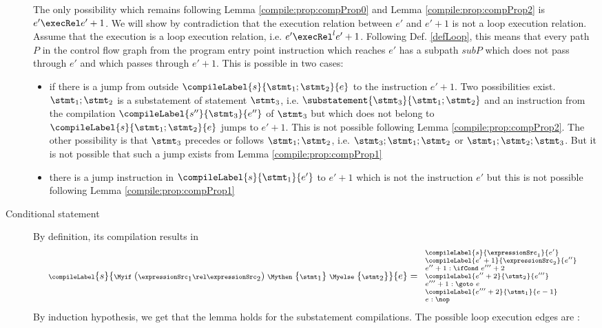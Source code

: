 \begin{description}
The only possibility which remains following
  Lemma \ref{compile:prop:compProp0} and Lemma \ref{compile:prop:compProp2}  is
$e' \execRel e'+1$. We will show  by contradiction that the execution relation between $e'$ and $e'+1$ is not a loop execution relation.
Assume that the execution is a loop execution relation, i.e. $e' \execRel^{l} e'+1$. Following Def. \ref{defLoop}, this means that every path $P$ in the control flow graph 
 from the program entry point instruction which reaches $e'$ has a subpath $ subP $ which does not pass through $e'$ and which passes through $e'+1$.
 This is possible in two cases:
\begin{itemize}
\item  if there is a jump from outside $\compileLabel{s}{\stmt_1;\stmt_2}{e}$ to the instruction $e'+1$.
       Two possibilities exist.  $\stmt_1;\stmt_2$ is a substatement of  statement $\stmt_3$, i.e. $\substatement{\stmt_3}{\stmt_1;\stmt_2 }$ 
       and an instruction from the compilation  $\compileLabel{s''}{\stmt_3}{e''}$ of $\stmt_3$ but which does not belong to  $\compileLabel{s}{\stmt_1;\stmt_2}{e}$ 
       jumps to $e'+1$.  This is not possible following Lemma \ref{compile:prop:compProp2}. The other possibility is that $\stmt_3$ precedes or follows
       $\stmt_1;\stmt_2$, i.e. $\stmt_3;\stmt_1;\stmt_2$ or $\stmt_1;\stmt_2;\stmt_3$. But it is not possible that such  a jump exists from Lemma  \ref{compile:prop:compProp1}

\item there is a jump instruction in $\compileLabel{s}{\stmt_1}{e'}$ to  $e'+1$ which is not the instruction $e'$
      but this is not possible following Lemma \ref{compile:prop:compProp1}
\end{itemize}


\item[Conditional statement]
By definition, its compilation results in
  $$ \scriptsize{\compileLabel{s}{ \Myif \ ( \expressionSrc_1 \rel \expressionSrc_2 ) \ \Mythen \ \{ \stmt_1 \} \  \Myelse \ \{ \stmt_2 \}   }{e} = 
\begin{array}{l}
  \compileLabel{s}{\expressionSrc_1}{e'}\\
  \compileLabel{e'+1}{\expressionSrc_2}{e''}\\  
  e'' + 1: \ifCond \ e''' + 2 \\
  \compileLabel{e'' + 2}{\stmt_2}{e'''}\\ 
  e''' + 1: \goto \ e \\ 
  \compileLabel{e''' +  2}{\stmt_1}{ e -1  }\\ 
  e: \nop 
\end{array}}
$$
 By induction hypothesis, we get that the lemma holds for the substatement compilations. The possible loop execution edges are :


\end{description}
